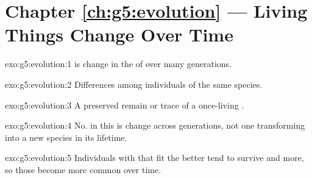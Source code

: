 \section*{Chapter \ref{ch:g5:evolution} --- Living Things Change Over Time}

\begin{solution}{exo:g5:evolution:1}
 is change in the  of  over many
generations.
\end{solution}

\begin{solution}{exo:g5:evolution:2}
Differences among individuals of the same species.
\end{solution}

\begin{solution}{exo:g5:evolution:3}
A preserved remain or trace of a once-living .
\end{solution}

\begin{solution}{exo:g5:evolution:4}
No.  in this  is  change across generations, not
one  transforming into a new species in its lifetime.
\end{solution}

\begin{solution}{exo:g5:evolution:5}
Individuals with  that fit the  better tend
to survive and  more, so those  become more common over
time.
\end{solution}

